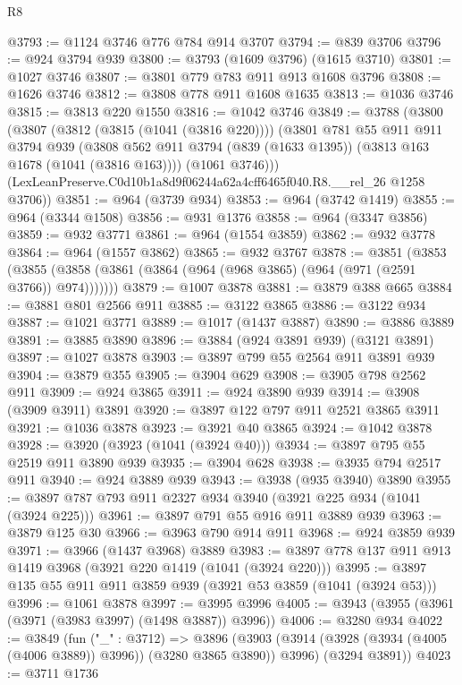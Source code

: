 \begin{lexlean}{R8}
\begin{coremodule}
@3793 := @1124 @3746 @776 @784 @914 @3707
@3794 := @839 @3706
@3796 := @924 @3794 @939
@3800 := @3793 (@1609 @3796) (@1615 @3710)
@3801 := @1027 @3746
@3807 := @3801 @779 @783 @911 @913 @1608 @3796
@3808 := @1626 @3746
@3812 := @3808 @778 @911 @1608 @1635
@3813 := @1036 @3746
@3815 := @3813 @220 @1550
@3816 := @1042 @3746
@3849 := @3788
    (@3800
      (@3807
        (@3812 (@3815 (@1041 (@3816 @220))))
        (@3801
          @781
          @55
          @911
          @911
          @3794
          @939
          (@3808 @562 @911 @3794 (@839 (@1633 @1395)) (@3813 @163 @1678 (@1041 (@3816 @163))))
          (@1061 @3746)))
      (LexLeanPreserve.C0d10b1a8d9f06244a62a4cff6465f040.R8.__rel_26 @1258 @3706))
@3851 := @964 (@3739 @934)
@3853 := @964 (@3742 @1419)
@3855 := @964 (@3344 @1508)
@3856 := @931 @1376
@3858 := @964 (@3347 @3856)
@3859 := @932 @3771
@3861 := @964 (@1554 @3859)
@3862 := @932 @3778
@3864 := @964 (@1557 @3862)
@3865 := @932 @3767
@3878 := @3851
    (@3853 (@3855 (@3858 (@3861 (@3864 (@964 (@968 @3865) (@964 (@971 (@2591 @3766)) @974)))))))
@3879 := @1007 @3878
@3881 := @3879 @388 @665
@3884 := @3881 @801 @2566 @911
@3885 := @3122 @3865
@3886 := @3122 @934
@3887 := @1021 @3771
@3889 := @1017 (@1437 @3887)
@3890 := @3886 @3889
@3891 := @3885 @3890
@3896 := @3884 (@924 @3891 @939) (@3121 @3891)
@3897 := @1027 @3878
@3903 := @3897 @799 @55 @2564 @911 @3891 @939
@3904 := @3879 @355
@3905 := @3904 @629
@3908 := @3905 @798 @2562 @911
@3909 := @924 @3865
@3911 := @924 @3890 @939
@3914 := @3908 (@3909 @3911) @3891
@3920 := @3897 @122 @797 @911 @2521 @3865 @3911
@3921 := @1036 @3878
@3923 := @3921 @40 @3865
@3924 := @1042 @3878
@3928 := @3920 (@3923 (@1041 (@3924 @40)))
@3934 := @3897 @795 @55 @2519 @911 @3890 @939
@3935 := @3904 @628
@3938 := @3935 @794 @2517 @911
@3940 := @924 @3889 @939
@3943 := @3938 (@935 @3940) @3890
@3955 := @3897 @787 @793 @911 @2327 @934 @3940 (@3921 @225 @934 (@1041 (@3924 @225)))
@3961 := @3897 @791 @55 @916 @911 @3889 @939
@3963 := @3879 @125 @30
@3966 := @3963 @790 @914 @911
@3968 := @924 @3859 @939
@3971 := @3966 (@1437 @3968) @3889
@3983 := @3897 @778 @137 @911 @913 @1419 @3968 (@3921 @220 @1419 (@1041 (@3924 @220)))
@3995 := @3897 @135 @55 @911 @911 @3859 @939 (@3921 @53 @3859 (@1041 (@3924 @53)))
@3996 := @1061 @3878
@3997 := @3995 @3996
@4005 := @3943 (@3955 (@3961 (@3971 (@3983 @3997) (@1498 @3887)) @3996))
@4006 := @3280 @934
@4022 := @3849
    (fun ("_" : @3712) =>
    @3896
      (@3903 (@3914 (@3928 (@3934 (@4005 (@4006 @3889)) @3996)) (@3280 @3865 @3890)) @3996)
      (@3294 @3891))
@4023 := @3711 @1736

\end{coremodule}
\end{lexlean}
